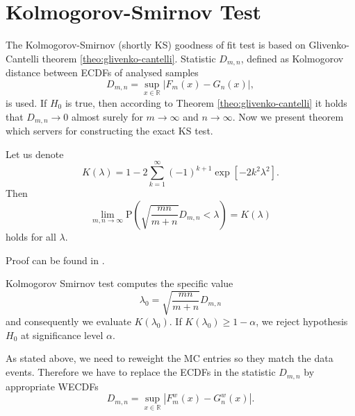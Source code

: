 \section{Kolmogorov-Smirnov Test}
The Kolmogorov-Smirnov (shortly KS)  goodness of fit test is based on Glivenko-Cantelli theorem \ref{theo:glivenko-cantelli}. Statistic $D_{m,n}$, defined as Kolmogorov distance between ECDFs of analysed samples
\begin{equation}
D_{m,n} = \sup_{x \in \mathbb{R}} |F_m(x) - G_n(x)|,
\label{eq:KSstat}
\end{equation}
is used. If $H_0$ is true, then according to Theorem \ref{theo:glivenko-cantelli} it holds that $D_{m,n} \rightarrow 0$ almost surely for $m \rightarrow \infty$ and $n \rightarrow \infty$. Now we present theorem which servers for constructing the exact KS test.
\begin{theorem}[Smirnov]
	Let us denote  
	\begin{equation}
	K(\lambda) = 1 - 2\sum_{k=1}^{\infty} (-1)^{k+1} \exp\left[ -2k^2\lambda^2\right].
	\end{equation}
	Then 
	\begin{equation}
	\lim_{m,n \rightarrow \infty} \mathrm{P}\left(\sqrt{\frac{mn}{m+n}}D_{m,n} < \lambda \right) = K(\lambda)
	\end{equation}
	holds for all $\lambda$.
\end{theorem}
\noindent Proof can be found in \cite{Smirnov1944}. 

\noindent Kolmogorov Smirnov test computes the specific value
\[\lambda_0 = \sqrt{\frac{mn}{m+n}}D_{m,n}\] and consequently we evaluate  $K\left( \lambda_0 \right)$. If $K\left( \lambda_0 \right) \geq 1 - \alpha$, we reject hypothesis $H_0$ at significance level $\alpha$.

As stated above, we need to reweight the MC entries so they match the data events. Therefore we have to replace the ECDFs in the statistic $D_{m,n}$ by appropriate WECDFs
\begin{equation}
D_{m,n} = \sup_{x \in \mathbb{R}} |F^w_m(x) - G^w_n(x)|.
\end{equation}

